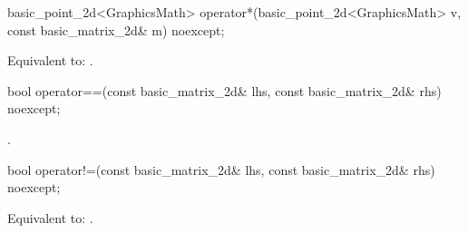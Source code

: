 %
\begin{itemdecl}
basic_point_2d<GraphicsMath> operator*(basic_point_2d<GraphicsMath> v, const basic_matrix_2d& m) noexcept;
\end{itemdecl}
\begin{itemdescr}
\pnum
\returns
Equivalent to: .
\end{itemdescr}

%
\begin{itemdecl}
bool operator==(const basic_matrix_2d& lhs, const basic_matrix_2d& rhs) noexcept;
\end{itemdecl}
\begin{itemdescr}
\pnum
\returns
{}.
\end{itemdescr}

%
\begin{itemdecl}
bool operator!=(const basic_matrix_2d& lhs, const basic_matrix_2d& rhs) noexcept;
\end{itemdecl}
\begin{itemdescr}
\pnum
\returns
Equivalent to: .
\end{itemdescr}
